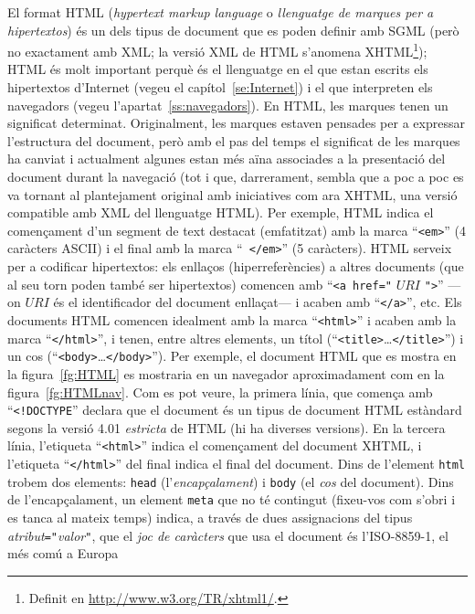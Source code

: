 El format HTML (\emph{hypertext markup language} o \emph{llenguatge de
  marques per a hipertextos}) és un dels tipus de document que es
poden definir amb SGML (però no exactament amb XML; la versió XML de
HTML s'anomena XHTML\footnote{Definit en
  \url{http://www.w3.org/TR/xhtml1/}.}); HTML és molt important perquè
és el llenguatge en el que estan escrits els hipertextos d'Internet
(vegeu el capítol~\ref{se:Internet}) i el que interpreten els
navegadors (vegeu l'apartat~\ref{ss:navegadors}). En HTML, les marques
tenen un significat determinat. Originalment, les marques estaven
pensades per a expressar l'estructura del document, però amb el pas
del temps el significat de les marques ha canviat i actualment algunes
estan més aïna associades a la presentació del document durant la
navegació (tot i que, darrerament, sembla que a poc a poc es va
tornant al plantejament original amb iniciatives com ara XHTML, una
versió compatible amb XML del llenguatge HTML). Per exemple, HTML
indica el començament d'un segment de text destacat (emfatitzat) amb la marca
``{\tt <em>}'' (4 caràcters ASCII) i el final amb la marca ``{\tt
  </em>}'' (5 caràcters). HTML serveix per a codificar hipertextos:
els enllaços (hiperreferències) a altres documents (que al seu torn
poden també ser hipertextos) comencen amb ``\texttt{<a href="}
$\mathit{URI}$ \texttt{"}\texttt{>}'' ---on $\mathit{URI}$ és el
identificador del document enllaçat--- i acaben amb ``\texttt{</a>}'',
etc. Els documents HTML comencen idealment amb la marca
``\texttt{<html>}'' i acaben amb la marca ``\texttt{</html>}'', i
tenen, entre altres elements, un títol
(``\texttt{<title>}\ldots\texttt{</title>}'') i un cos
(``\texttt{<body>}\ldots\texttt{</body>}'').  Per exemple, el document
HTML que es mostra en la figura~\ref{fg:HTML} es mostraria en un
navegador aproximadament com en la figura~\ref{fg:HTMLnav}. Com es pot
veure, la primera línia, que comença amb ``\texttt{<!DOCTYPE}''
declara que el document és un tipus de document HTML estàndard segons
la versió 4.01 \emph{estricta} de HTML (hi ha diverses versions).  En
la tercera línia, l'etiqueta ``\texttt{<html>}'' indica el començament
del document XHTML, i l'etiqueta ``\texttt{</html>}'' del final indica
el final del document. Dins de l'element \texttt{html} trobem dos
elements: \texttt{head} (l'\emph{encapçalament}) i \texttt{body} (el
\emph{cos} del document).  Dins de l'encapçalament, un element
\texttt{meta} que no té contingut (fixeu-vos com s'obri i es tanca al
mateix temps) indica, a través de dues assignacions del tipus
\emph{atribut}\texttt{="}\emph{valor}\texttt{"}, que el \emph{joc de
  caràcters} que usa el document és l'ISO-8859-1, el més comú a Europa
